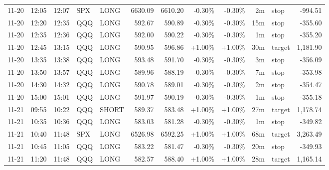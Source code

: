 \documentclass[11pt,a4paper]{article}
\begin{document}
\begin{center}
\begin{longtable}{>{\color{txtmain}}l l l l l r r r r r >{\color{txtmain}}l r}
11-20 & 12:05 & 12:07 & SPX & LONG & 6630.09 & 6610.20 & \textcolor{lossred}{-0.30\%} & \textcolor{lossred}{-0.30\%} & 2m & stop & \textcolor{lossred}{-994.51} \\
11-20 & 12:20 & 12:35 & QQQ & LONG & 592.67 & 590.89 & \textcolor{lossred}{-0.30\%} & \textcolor{lossred}{-0.30\%} & 15m & stop & \textcolor{lossred}{-355.60} \\
11-20 & 12:35 & 12:36 & QQQ & LONG & 592.00 & 590.22 & \textcolor{lossred}{-0.30\%} & \textcolor{lossred}{-0.30\%} & 1m & stop & \textcolor{lossred}{-355.20} \\
11-20 & 12:45 & 13:15 & QQQ & LONG & 590.95 & 596.86 & \textcolor{wingreen}{+1.00\%} & \textcolor{wingreen}{+1.00\%} & 30m & target & \textcolor{wingreen}{1,181.90} \\
11-20 & 13:35 & 13:38 & QQQ & LONG & 593.48 & 591.70 & \textcolor{lossred}{-0.30\%} & \textcolor{lossred}{-0.30\%} & 3m & stop & \textcolor{lossred}{-356.09} \\
11-20 & 13:50 & 13:57 & QQQ & LONG & 589.96 & 588.19 & \textcolor{lossred}{-0.30\%} & \textcolor{lossred}{-0.30\%} & 7m & stop & \textcolor{lossred}{-353.98} \\
11-20 & 14:30 & 14:32 & QQQ & LONG & 590.78 & 589.01 & \textcolor{lossred}{-0.30\%} & \textcolor{lossred}{-0.30\%} & 2m & stop & \textcolor{lossred}{-354.47} \\
11-20 & 15:00 & 15:01 & QQQ & LONG & 591.97 & 590.19 & \textcolor{lossred}{-0.30\%} & \textcolor{lossred}{-0.30\%} & 1m & stop & \textcolor{lossred}{-355.18} \\
11-21 & 09:55 & 10:22 & QQQ & SHORT & 589.37 & 583.48 & \textcolor{wingreen}{+1.00\%} & \textcolor{wingreen}{+1.00\%} & 27m & target & \textcolor{wingreen}{1,178.74} \\
11-21 & 10:35 & 10:36 & QQQ & LONG & 583.03 & 581.28 & \textcolor{lossred}{-0.30\%} & \textcolor{lossred}{-0.30\%} & 1m & stop & \textcolor{lossred}{-349.82} \\
11-21 & 10:40 & 11:48 & SPX & LONG & 6526.98 & 6592.25 & \textcolor{wingreen}{+1.00\%} & \textcolor{wingreen}{+1.00\%} & 68m & target & \textcolor{wingreen}{3,263.49} \\
11-21 & 10:45 & 11:05 & QQQ & LONG & 583.22 & 581.47 & \textcolor{lossred}{-0.30\%} & \textcolor{lossred}{-0.30\%} & 20m & stop & \textcolor{lossred}{-349.93} \\
11-21 & 11:20 & 11:48 & QQQ & LONG & 582.57 & 588.40 & \textcolor{wingreen}{+1.00\%} & \textcolor{wingreen}{+1.00\%} & 28m & target & \textcolor{wingreen}{1,165.14} \\

\end{longtable}
\end{center}
\end{document}
